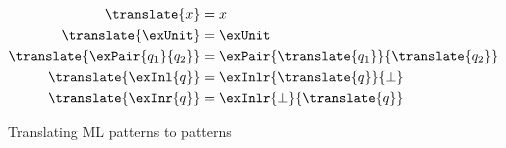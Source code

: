 \begin{figure}
\small
\begin{align*}
\translate{x}
&=
x
\\
\translate{\exUnit}
&=
\exUnit
\\
\translate{\exPair{q_1}{q_2}}
&=
\exPair{\translate{q_1}}{\translate{q_2}}
\\
\translate{\exInl{q}}
&=
\exInlr{\translate{q}}{\bot}
\\
\translate{\exInr{q}}
&=
\exInlr{\bot}{\translate{q}}
\end{align*}
\caption{Translating ML patterns to patterns}
\end{figure}
